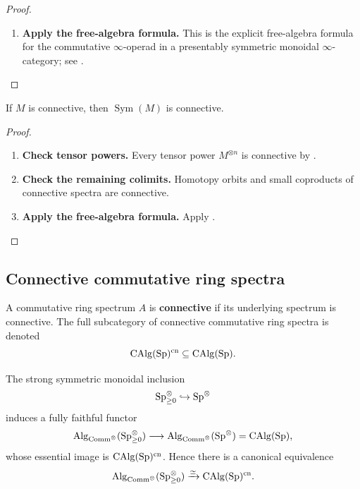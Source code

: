 \begin{proof}
\leavevmode
\begin{enumerate}[label=\textup{(\arabic*)}]
    \item \textbf{Apply the free-algebra formula.}
    This is the explicit free-algebra formula for the commutative
    $\infty$-operad in a presentably symmetric monoidal $\infty$-category; see
    \cite{LurieHigherAlgebra}.
\end{enumerate}
\end{proof}

\begin{corollary}
\label{cor:free-algebra-connective}
If $M$ is connective, then $\operatorname{Sym}(M)$ is connective.
\end{corollary}

\begin{proof}
\leavevmode
\begin{enumerate}[label=\textup{(\arabic*)}]
    \item \textbf{Check tensor powers.}
    Every tensor power $M^{\otimes n}$ is connective by
    .

    \item \textbf{Check the remaining colimits.}
    Homotopy orbits and small coproducts
    of connective spectra are connective.

    \item \textbf{Apply the free-algebra formula.}
    Apply
    .
\end{enumerate}
\end{proof}

\subsection{Connective commutative ring spectra}

\begin{definition}
\label{def:connective-e-infinity-ring}
A commutative ring spectrum $A$ is \textbf{connective} if its underlying
spectrum is connective. The full subcategory of connective commutative
ring spectra is denoted
\[
    \operatorname{CAlg}(\operatorname{Sp})^{\mathrm{cn}}
    \subseteq
    \operatorname{CAlg}(\operatorname{Sp}).
\]
\end{definition}

\begin{proposition}
\label{prop:connective-calg-operadic-universe}
The strong symmetric monoidal inclusion
\[
    \operatorname{Sp}_{\geq0}^\otimes
    \hookrightarrow
    \operatorname{Sp}^\otimes
\]
induces a fully faithful functor
\[
    \operatorname{Alg}_{\mathrm{Comm}^\otimes}(\operatorname{Sp}_{\geq0}^\otimes)
    \longrightarrow
    \operatorname{Alg}_{\mathrm{Comm}^\otimes}(\operatorname{Sp}^\otimes)
    =
    \operatorname{CAlg}(\operatorname{Sp}),
\]
whose essential image is \(\operatorname{CAlg}(\operatorname{Sp})^{\mathrm{cn}}\). Hence there is a
canonical equivalence
\[
    \operatorname{Alg}_{\mathrm{Comm}^\otimes}(\operatorname{Sp}_{\geq0}^\otimes)
    \xrightarrow{\simeq}
    \operatorname{CAlg}(\operatorname{Sp})^{\mathrm{cn}}.
\]
\end{proposition}

